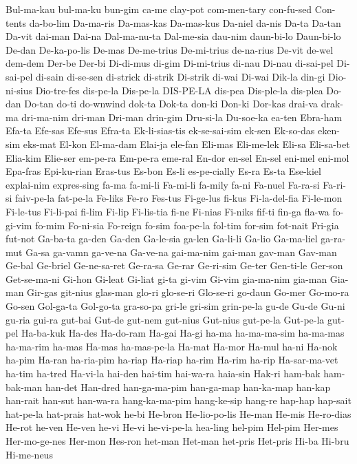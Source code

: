 {Bul-ma-kau
bul-ma-ku
bun-gim
ca-me
clay-pot
com-men-tary
con-fu-sed
Con-tents
da-bo-lim
Da-ma-ris
Da-mas-kas
Da-mas-kus
Da-niel
da-nis
Da-ta
Da-tan
Da-vit
dai-man
Dai-na
Dal-ma-nu-ta
Dal-me-sia
dau-nim
daun-bi-lo
Daun-bi-lo
De-dan
De-ka-po-lis
De-mas
De-me-trius
De-mi-trius
de-na-rius
De-vit
de-wel
dem-dem
Der-be
Der-bi
Di-di-mus
di-gim
Di-mi-trius
di-nau
Di-nau
di-sai-pel
Di-sai-pel
di-sain
di-se-sen
di-strick
di-strik
Di-strik
di-wai
Di-wai
Dik-la
din-gi
Dio-ni-sius
Dio-tre-fes
dis-pe-la
Dis-pe-la
DIS-PE-LA
dis-pea
Dis-ple-la
dis-plea
Do-dan
Do-tan
do-ti
do-wnwind
dok-ta
Dok-ta
don-ki
Don-ki
Dor-kas
drai-va
drak-ma
dri-ma-nim
dri-man
Dri-man
drin-gim
Dru-si-la
Du-soe-ka
ea-ten
Ebra-ham
Efa-ta
Efe-sas
Efe-sus
Efra-ta
Ek-li-sias-tis
ek-se-sai-sim
ek-sen
Ek-so-das
eken-sim
eks-mat
El-kon
El-ma-dam
Elai-ja
ele-fan
Eli-mas
Eli-me-lek
Eli-sa
Eli-sa-bet
Elia-kim
Elie-ser
em-pe-ra
Em-pe-ra
eme-ral
En-dor
en-sel
En-sel
eni-mel
eni-mol
Epa-fras
Epi-ku-rian
Eras-tus
Es-bon
Es-li
es-pe-cially
Es-ra
Es-ta
Ese-kiel
explai-nim
expres-sing
fa-ma
fa-mi-li
Fa-mi-li
fa-mily
fa-ni
Fa-nuel
Fa-ra-si
Fa-ri-si
faiv-pe-la
fat-pe-la
Fe-liks
Fe-ro
Fes-tus
Fi-ge-lus
fi-kus
Fi-la-del-fia
Fi-le-mon
Fi-le-tus
Fi-li-pai
fi-lim
Fi-lip
Fi-lis-tia
fi-ne
Fi-nias
Fi-niks
fif-ti
fin-ga
fla-wa
fo-gi-vim
fo-mim
Fo-ni-sia
Fo-reign
fo-sim
foa-pe-la
fol-tim
for-sim
fot-nait
Fri-gia
fut-not
Ga-ba-ta
ga-den
Ga-den
Ga-le-sia
ga-len
Ga-li-li
Ga-lio
Ga-ma-liel
ga-ra-mut
Ga-sa
ga-vamn
ga-ve-na
Ga-ve-na
gai-ma-nim
gai-man
gav-man
Gav-man
Ge-bal
Ge-briel
Ge-ne-sa-ret
Ge-ra-sa
Ge-rar
Ge-ri-sim
Ge-ter
Gen-ti-le
Ger-son
Get-se-ma-ni
Gi-hon
Gi-leat
Gi-liat
gi-ta
gi-vim
Gi-vim
gia-ma-nim
gia-man
Gia-man
Gir-gas
git-nius
glas-man
glo-ri
glo-se-ri
Glo-se-ri
go-daun
Go-mer
Go-mo-ra
Go-sen
Gol-ga-ta
Gol-go-ta
gra-so-pa
gri-le
gri-sim
grin-pe-la
gu-de
Gu-de
Gu-ni
gu-ria
gui-ra
gut-bai
Gut-de
gut-nem
gut-nius
Gut-nius
gut-pe-la
Gut-pe-la
gut-pel
Ha-ba-kuk
Ha-des
Ha-do-ram
Ha-gai
Ha-gi
ha-ma
ha-ma-ma-sim
ha-ma-mas
ha-ma-rim
ha-mas
Ha-mas
ha-mas-pe-la
Ha-mat
Ha-mor
Ha-mul
ha-ni
Ha-nok
ha-pim
Ha-ran
ha-ria-pim
ha-riap
Ha-riap
ha-rim
Ha-rim
ha-rip
Ha-sar-ma-vet
ha-tim
ha-tred
Ha-vi-la
hai-den
hai-tim
hai-wa-ra
haia-sin
Hak-ri
ham-bak
ham-bak-man
han-det
Han-dred
han-ga-ma-pim
han-ga-map
han-ka-map
han-kap
han-rait
han-sut
han-wa-ra
hang-ka-ma-pim
hang-ke-sip
hang-re
hap-hap
hap-sait
hat-pe-la
hat-prais
hat-wok
he-bi
He-bron
He-lio-po-lis
He-man
He-mis
He-ro-dias
He-rot
he-ven
He-ven
he-vi
He-vi
he-vi-pe-la
hea-ling
hel-pim
Hel-pim
Her-mes
Her-mo-ge-nes
Her-mon
Hes-ron
het-man
Het-man
het-pris
Het-pris
Hi-ba
Hi-bru
Hi-me-neus
}
